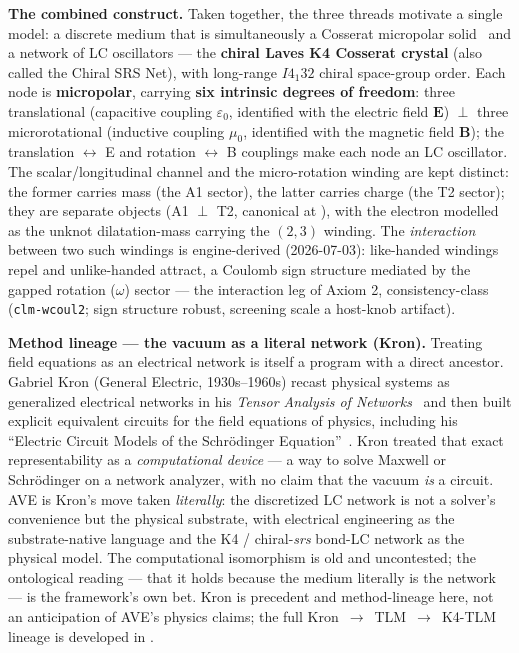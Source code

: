 \vspace{0.5em}
\noindent \textbf{The combined construct.} Taken together, the three threads motivate a single model: a discrete medium that is simultaneously a Cosserat micropolar solid~\cite{cosserat1909deformables} and a network of LC oscillators --- the \textbf{chiral Laves K4 Cosserat crystal} (also called the Chiral SRS Net), with long-range $I4_1 32$ chiral space-group order. Each node is \textbf{micropolar}, carrying \textbf{six intrinsic degrees of freedom}: three translational (capacitive coupling $\varepsilon_0$, identified with the electric field $\mathbf{E}$) $\perp$ three microrotational (inductive coupling $\mu_0$, identified with the magnetic field $\mathbf{B}$); the translation $\leftrightarrow$ E and rotation $\leftrightarrow$ B couplings make each node an LC oscillator. The scalar/longitudinal channel and the micro-rotation winding are kept distinct: the former carries mass (the A1 sector), the latter carries charge (the T2 sector); they are separate objects (A1 $\perp$ T2, canonical at ), with the electron modelled as the unknot dilatation-mass carrying the $(2,3)$ winding. The \emph{interaction} between two such windings is engine-derived (2026-07-03): like-handed windings repel and unlike-handed attract, a Coulomb sign structure mediated by the gapped rotation ($\omega$) sector --- the interaction leg of Axiom 2, consistency-class (\texttt{clm-wcoul2}; sign structure robust, screening scale a host-knob artifact).

\vspace{0.5em}
\noindent \textbf{Method lineage --- the vacuum as a literal network (Kron).} Treating field equations as an electrical network is itself a program with a direct ancestor. Gabriel Kron (General Electric, 1930s--1960s) recast physical systems as generalized electrical networks in his \emph{Tensor Analysis of Networks}~\cite{kron1939tensor} and then built explicit equivalent circuits for the field equations of physics, including his ``Electric Circuit Models of the Schr\"odinger Equation''~\cite{kron1945schrodinger}. Kron treated that exact representability as a \emph{computational device} --- a way to solve Maxwell or Schr\"odinger on a network analyzer, with no claim that the vacuum \emph{is} a circuit. AVE is Kron's move taken \emph{literally}: the discretized LC network is not a solver's convenience but the physical substrate, with electrical engineering as the substrate-native language and the K4 / chiral-\emph{srs} bond-LC network as the physical model. The computational isomorphism is old and uncontested; the ontological reading --- that it holds because the medium literally is the network --- is the framework's own bet. Kron is precedent and method-lineage here, not an anticipation of AVE's physics claims; the full \mbox{Kron $\to$ TLM $\to$ K4-TLM} lineage is developed in .

